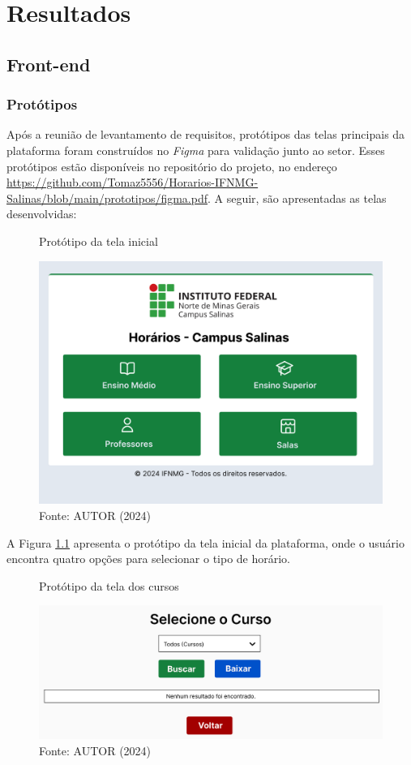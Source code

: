 \chapter{Resultados} 
\label{cap5_resultados}

\section{Front-end}

\subsection{Protótipos}

Após a reunião de levantamento de requisitos, protótipos das telas principais da plataforma foram construídos no \textit{Figma} para validação junto ao setor. Esses protótipos estão disponíveis no repositório do projeto, no endereço \url{https://github.com/Tomaz5556/Horarios-IFNMG-Salinas/blob/main/prototipos/figma.pdf}. A seguir, são apresentadas as telas desenvolvidas:

\begin{figure}[htb]
    \centering
    \caption{Protótipo da tela inicial}
    \includegraphics[width=1\textwidth]{Figuras/proto-1.png}
    \caption*{Fonte: AUTOR (2024)}
    \label{fig_proto_1}
\end{figure}

A Figura \ref{fig_proto_1} apresenta o protótipo da tela inicial da plataforma, onde o usuário encontra quatro opções para selecionar o tipo de horário.

\begin{figure}[H]
    \centering
    \caption{Protótipo da tela dos cursos}
    \includegraphics[width=1\textwidth]{Figuras/proto-2.PNG}
    \caption*{Fonte: AUTOR (2024)}
    \label{fig_proto_2}
\end{figure}

